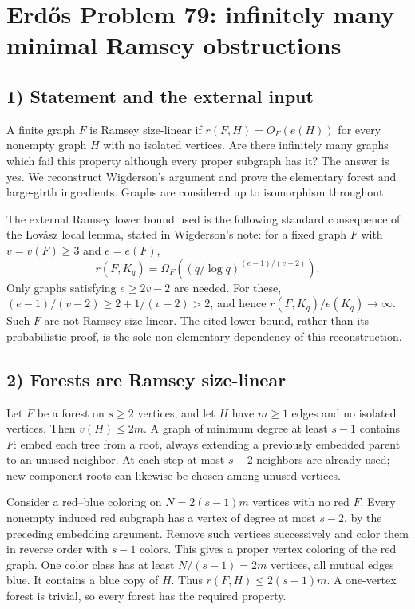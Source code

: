 \section{Erd\H{o}s Problem 79: infinitely many minimal Ramsey obstructions}

\subsection{1) Statement and the external input}
A finite graph $F$ is Ramsey size-linear if $r(F,H)=O_F(e(H))$
for every nonempty graph $H$ with no isolated vertices. Are there
infinitely many graphs which fail this property although every
proper subgraph has it? The answer is yes. We reconstruct Wigderson's
argument and prove the elementary forest and large-girth ingredients.
Graphs are considered up to isomorphism throughout.

The external Ramsey lower bound used is the following standard
consequence of the Lov\'asz local lemma, stated in Wigderson's note:
for a fixed graph $F$ with $v=v(F)\geq3$ and $e=e(F)$,
\[
 r(F,K_q)=\Omega_F\left((q/\log q)^{(e-1)/(v-2)}\right).
\]
Only graphs satisfying $e\geq2v-2$ are needed. For these,
$(e-1)/(v-2)\geq2+1/(v-2)>2$, and hence
$r(F,K_q)/e(K_q)\to\infty$. Such $F$ are not Ramsey size-linear.
The cited lower bound, rather than its probabilistic proof, is
the sole non-elementary dependency of this reconstruction.

\subsection{2) Forests are Ramsey size-linear}
Let $F$ be a forest on $s\geq2$ vertices, and let $H$ have $m\geq1$
edges and no isolated vertices. Then $v(H)\leq2m$. A graph of minimum
degree at least $s-1$ contains $F$: embed each tree from a root,
always extending a previously embedded parent to an unused neighbor.
At each step at most $s-2$ neighbors are already used; new component
roots can likewise be chosen among unused vertices.

Consider a red--blue coloring on $N=2(s-1)m$ vertices with no red
$F$. Every nonempty induced red subgraph has a vertex of degree
at most $s-2$, by the preceding embedding argument. Remove such
vertices successively and color them in reverse order with $s-1$
colors. This gives a proper vertex coloring of the red graph.
One color class has at least $N/(s-1)=2m$ vertices, all mutual
edges blue. It contains a blue copy of $H$. Thus
$r(F,H)\leq2(s-1)m$. A one-vertex forest is trivial, so every
forest has the required property.

